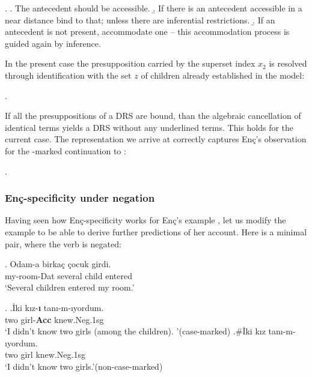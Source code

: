 \documentclass[11pt,a4paper]{article}
\newcommand{\encspec}{Enç-specific}
\begin{document}
\ex.
\a. The antecedent should be accessible.
\b. If there is an antecedent accessible in a near distance bind to that; unless there are inferential restrictions.
\b. If an antecedent is not present, accommodate one -- this accommodation process is guided again by inference.

In the present case the presupposition carried by the superset index $x_2$ is resolved through identification with the set $z$ of children already established in the model:

\ex.


If all the presuppositions of a DRS are bound, than the algebraic cancellation of identical terms yields a DRS without any underlined terms. This holds for the current case. The representation we arrive at correctly captures Enç's observation for the \acc-marked continuation to :

\ex.

\subsubsection{\encspec ity under negation}

Having seen how \encspec ity works for Enç's example , let us modify the example to be able to derive further predictions of her account. Here is a minimal pair, where the verb  is negated:

\exg.\label{Exenc16neg}%
{Odam-a}  {birka\c{c}} {\c{c}ocuk} {girdi.}\\
{my-room-Dat} {several}  {child}  {entered}\\
`Several children entered my room.'

\ex.\label{Exenc17neg}
\ag.\label{Exencnegacc}{\.Iki}  {k\i{}z-\textbf{\i}} {tan\i{}-m-ıyordum}.\\
{two}  {girl-{\bf Acc}}  {knew.Neg.1sg}\\
`I didn't know two girls (among the children). '\hfill (case-marked)
\bg.\label{Exencnegzero}\#{\.Iki}  {k\i{}z}  {tan\i{}-m-ıyordum.} \\
{two}  {girl}  {knew.Neg.1sg}\\
`I didn't know two girls.'\hfill (non-case-marked)
\end{document}
